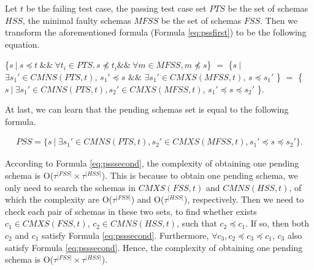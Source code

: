 {Let $t$ be the failing test case, the passing test case set $PTS$ be the set of schemas $HSS$, the minimal faulty schemas $MFSS$ be the set of schemas $FSS$. Then we transform the aforementioned formula (Formula \ref{eq:pssfirst}) to be the following equation.

\{$s\ |\ s \preceq t\ \&\&\ \forall t_{i} \in PTS, s \npreceq t_{i} \&\&\ \forall m \in MFSS, m \npreceq s   $\} $=$  \{$ s\ |\ $ $\exists s_{1}' \in CMNS(PTS, t)$, $s_{1}' \preceq s$  $\&\&$ $\exists s_{1}' \in CMXS(MFSS, t)$, $s \preceq s_{1}'$  \} $=$  \{$ s\ |\ \exists s_{1}' \in CMNS(PTS, t), s_{2}' \in CMXS(MFSS, t)$, $s_{1}' \preceq s \preceq s_{2}'$ \}.

At last, we can learn that the pending schemas set is equal to the following formula.



\begin{equation}\label{eq:psssecond}
\begin{aligned}
PSS =  \{ s\ |\ \exists s_{1}' \in CMNS(PTS, t), s_{2}' \in CMXS(MFSS, t),  s_{1}' \preceq s \preceq s_{2}' \}.
\end{aligned}
\end{equation}

According to Formula \ref{eq:psssecond}, the complexity of obtaining one pending schema is O($ \tau^{|FSS|} \times \tau^{|HSS|}$). This is because to obtain one pending schema, we only need to search the schemas in $CMXS(FSS, t)$ and $CMNS(HSS, t)$, of which the complexity are O($\tau^{|FSS|}$) and O($\tau^{|HSS|}$), respectively. Then we need to check each pair of schemas in these two sets, to find whether exists $c_{1} \in CMXS(FSS, t)$, $c_{2} \in CMNS(HSS, t)$, such that $c_{2} \preceq c_{1}$. If so, then both $c_{2}$ and $c_{1}$ satisfy Formula \ref{eq:psssecond}. Furthermore, $\forall c_{3}, c_{2} \preceq c_{3} \preceq c_{1}$, $c_{3}$ also satisfy Formula \ref{eq:psssecond}. Hence, the complexity of obtaining one pending schema is O($\tau^{|FSS|} \times \tau^{|HSS|}$).

}
